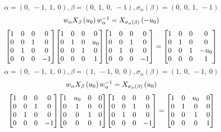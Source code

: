 \documentclass[11pt]{article}
\theoremstyle{definition}
\begin{document}
\[
\alpha = \left( 0, \  -1, \  1, \  0\right), \beta = \left( 0, \  1, \  0, \  -1\right), \sigma_{\alpha}(\beta) = \left( 0, \  0, \  1, \  -1\right)
\]
\[
\scaletoalign{\textwidth}{w_{\alpha} X_{\beta}\left(u_{0}\right) w_{\alpha}^{-1} = X_{\sigma_{\alpha}\left(\beta\right)}\left(- u_{0}\right)}
\]
\[
\scaletoalign{\textwidth}{{\left[\begin{matrix}1 & 0 & 0 & 0\\0 & 0 & 1 & 0\\0 & 1 & 0 & 0\\0 & 0 & 0 & -1\end{matrix}\right]} {\left[\begin{matrix}1 & 0 & 0 & 0\\0 & 1 & 0 & u_{0}\\0 & 0 & 1 & 0\\0 & 0 & 0 & 1\end{matrix}\right]} {\left[\begin{matrix}1 & 0 & 0 & 0\\0 & 0 & 1 & 0\\0 & 1 & 0 & 0\\0 & 0 & 0 & -1\end{matrix}\right]} = {\left[\begin{matrix}1 & 0 & 0 & 0\\0 & 1 & 0 & 0\\0 & 0 & 1 & - u_{0}\\0 & 0 & 0 & 1\end{matrix}\right]}}
\]
\[
\alpha = \left( 0, \  -1, \  1, \  0\right), \beta = \left( 1, \  -1, \  0, \  0\right), \sigma_{\alpha}(\beta) = \left( 1, \  0, \  -1, \  0\right)
\]
\[
\scaletoalign{\textwidth}{w_{\alpha} X_{\beta}\left(u_{0}\right) w_{\alpha}^{-1} = X_{\sigma_{\alpha}\left(\beta\right)}\left(u_{0}\right)}
\]
\[
\scaletoalign{\textwidth}{{\left[\begin{matrix}1 & 0 & 0 & 0\\0 & 0 & 1 & 0\\0 & 1 & 0 & 0\\0 & 0 & 0 & -1\end{matrix}\right]} {\left[\begin{matrix}1 & u_{0} & 0 & 0\\0 & 1 & 0 & 0\\0 & 0 & 1 & 0\\0 & 0 & 0 & 1\end{matrix}\right]} {\left[\begin{matrix}1 & 0 & 0 & 0\\0 & 0 & 1 & 0\\0 & 1 & 0 & 0\\0 & 0 & 0 & -1\end{matrix}\right]} = {\left[\begin{matrix}1 & 0 & u_{0} & 0\\0 & 1 & 0 & 0\\0 & 0 & 1 & 0\\0 & 0 & 0 & 1\end{matrix}\right]}}
\]
\end{document}

